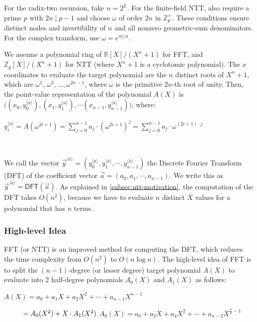 For the radix-two recursion, take $n=2^L$. For the finite-field NTT, also require a prime $p$ with $2n\mid p-1$ and choose $\omega$ of order $2n$ in $\mathbb Z_p^\times$. These conditions ensure distinct nodes and invertibility of $n$ and all nonzero geometric-sum denominators. For the complex transform, use $\omega=e^{\pi i/n}$.

We assume a polynomial ring of $\mathbb{R}[X]/ (X^n + 1)$ for FFT, and $\mathbb{Z}_p[X]/ (X^n + 1)$ for NTT (where $X^n + 1$ is a cyclotomic polynomial). The $x$ coordinates to evaluate the target polynomial are the $n$ distinct roots of $X^n + 1$, which are $\omega^1$, $\omega^3, \ldots, \omega^{2n-1}$, where $\omega$ is the primitive $2n$-th root of unity. Then, the point-value representation of the polynomial $A(X)$ is $\bm ( ({x}_0, {y}_0^{\langle a \rangle}), ({x}_1, {y}_1^{\langle a \rangle}), \cdots ({x}_{n-1}, {y}_{n-1}^{\langle a \rangle}) \bm )$, where: 

${y}_i^{\langle a \rangle} = A(\omega^{2i + 1}) = \sum\limits_{j=0}^{n-1}a_{j}\cdot (\omega^{2i + 1})^j = \sum\limits_{j=0}^{n-1}a_{j}\cdot \omega^{(2i + 1)\cdot j}$

$ $

We call the vector $\vec{y}^{\langle a \rangle} = (y_0^{\langle a \rangle}, y_1^{\langle a \rangle}, \cdots, y_{n-1}^{\langle a \rangle})$ the Discrete Fourier Transform (DFT) of the coefficient vector $\vec{a} = (a_0, a_1, \cdots, a_{n-1})$. We write this as $\vec{y}^{\langle a \rangle} = \textsf{DFT}(\vec{a})$. As explained in \autoref{subsec:ntt-motivation}, the computation of the DFT takes $O(n^2)$, because we have to evaluate $n$ distinct $X$ values for a polynomial that has $n$ terms.

\subsubsection{High-level Idea}
\label{subsec:ntt-forward-overview}

FFT (or NTT) is an improved method for computing the DFT, which reduces the time complexity from $O(n^2)$ to $O(n \log n)$. The high-level idea of FFT is to split the $(n-1)$-degree (or lesser degree) target polynomial $A(X)$ to evaluate into 2 half-degree polynomials $A_0(X)$ and $A_1(X)$ as follows:


$A(X) = a_0 + a_1X + a_2X^2 + \cdots + a_{n-1}X^{n - 1}$

$\textcolor{white}{A(X) }= A_0(X^2) + X \cdot A_1(X^2)$
$A_0(X) = a_0 + a_2X + a_4X^2 + \cdots + a_{n-2}X^{\frac{n}{2} - 1}$

